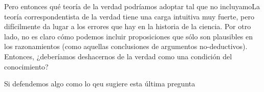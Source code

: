 {Pero entonces qué teoría de la verdad podríamos adoptar tal que no incluyamoLa teoría correspondentista de la verdad tiene una carga intuitiva muy fuerte, pero difícilmente da lugar a los errores que hay en la historia de la ciencia. Por otro lado, no es claro cómo podemos incluir proposiciones que sólo son plausibles en los razonamientos (como aquellas conclusiones de argumentos no-deductivos). Entonces, ¿deberíamos deshacernos de la verdad como una condición del conocimiento?

Si defendemos algo como lo qeu sugiere esta última pregunta





}
